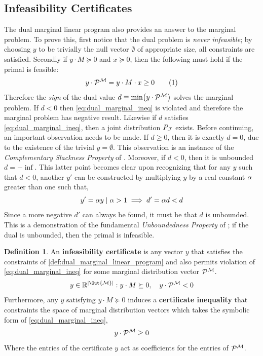 \documentclass[aps, 10pt, english, twoside, pra, nofootinbib, longbibliography]{revtex4-1}
\theoremstyle{plain}
\theoremstyle{definition}
\newtheorem{definition}[theorem]{Definition}
\theoremstyle{remark}
\newcommand{\mscenario}{\mathcal{M}}
\newcommand{\jointvar}{\mathcal{J}}
\newcommand{\term}[1]{\textcolor{Mahogany}{\textbf{#1}}}
\begin{document}
    \subsection{Infeasibility Certificates}
    \label{sec:infeasibility_certificates}
    The dual marginal linear program also provides an answer to the marginal problem. To prove this, first notice that the dual problem is \textit{never infeasible}; by choosing $y$ to be trivially the null vector $\emptyset$ of appropriate size, all constraints are satisfied. Secondly if $y \cdot M \succeq 0$ and $x \succeq 0$, then the following must hold if the primal is feasible:
    \[ y \cdot \probvec^{\mscenario} =  y \cdot M \cdot x \geq 0 \eq \label{eq:dual_marginal_ineq} \]
    Therefore the \textit{sign} of the dual value $d \defined \min \br{y \cdot \probvec^{\mscenario}}$ solves the marginal problem. If $d < 0$ then \cref{eq:dual_marginal_ineq} is violated and therefore the marginal problem has negative result. Likewise if $d$ satisfies \cref{eq:dual_marginal_ineq}, then a joint distribution $\prob[\jointvar]$ exists. Before continuing, an important observation needs to be made. If $d \geq 0$, then it is exactly $d = 0$, due to the existence of the trivial $y = \emptyset$. This observation is an instance of the \textit{Complementary Slackness Property} of \cite{Bradley_1977}.  Moreover, if $d < 0$, then it is unbounded $d = -\inf$. This latter point becomes clear upon recognizing that for any $y$ such that $d < 0$, another $y'$ can be constructed by multiplying $y$ by a real constant $\alpha$ greater than one such that,
    \[ y' = \alpha y \mid \alpha > 1 \implies d' = \alpha d < d \]
    Since a more negative $d'$ can always be found, it must be that $d$ is unbounded. This is a demonstration of the fundamental \textit{Unboundedness Property} of \cite{Bradley_1977}; if the dual is unbounded, then the primal is infeasible.


    \begin{definition} An \term{infeasibility certificate} is any vector $y$ that satisfies the constraints of \cref{def:dual_marginal_linear_program} and also permits violation of \cref{eq:dual_marginal_ineq} for some marginal distribution vector $\probvec^{\mscenario}$.
    \[ y \in \R^{\abs{\Out{\mscenario}}} : y \cdot M \succeq 0, \quad y \cdot \probvec^{\mscenario} < 0 \]
    Furthermore, any $y$ satisfying $y \cdot M \succeq 0$ induces a \term{certificate inequality} that constraints the space of marginal distribution vectors which takes the symbolic form of \cref{eq:dual_marginal_ineq},
    \[ y \cdot \probvec^{\mscenario} \geq 0 \]
    Where the entries of the certificate $y$ act as coefficients for the entries of $\probvec^{\mscenario}$.
    \end{definition}
\end{document}
